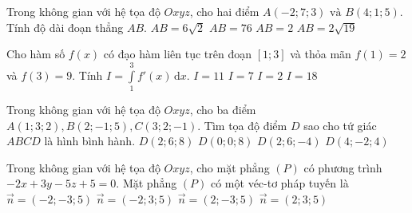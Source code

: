 \begin{ex}%
Trong không gian với hệ tọa độ $Oxyz$, cho hai điểm $A(-2;7;3) \text{ và } B(4;1;5)$. Tính độ dài đoạn thẳng $AB$.
\choice
{$AB=6\sqrt{2}$}
{$AB=76$}
{$AB=2$}
{\True $AB=2\sqrt{19}$}

\end{ex}


\begin{ex}%
Cho hàm số $f(x)$ có đạo hàm liên tục trên đoạn $[1;3]$ và thỏa mãn $f(1)=2$ và $f(3)=9$. Tính $I=\displaystyle\int\limits_1^3 f'(x)\mathrm{\,d}x$.
\choice
{$I=11$}
{\True $I=7$}
{$I=2$}
{$I=18$}

\end{ex}


\begin{ex}%
Trong không gian với hệ tọa độ $Oxyz$, cho ba điểm $A(1;3;2),B(2;-1;5),C(3;2;-1)$. Tìm tọa độ điểm $D$ sao cho tứ giác $ABCD$ là hình bình hành.
\choice
{$D(2;6;8)$}
{$D(0;0;8)$}
{\True $D(2;6;-4)$}
{$D(4;-2;4)$}

\end{ex}


\begin{ex}%
Trong không gian với hệ tọa độ $Oxyz$, cho mặt phẳng $(P)$ có phương trình $-2x+3y-5z+5=0$. Mặt phẳng $(P)$ có một véc-tơ pháp tuyến là
\choice
{$\overrightarrow{n}=(-2;-3;5)$}
{$\overrightarrow{n}=(-2;3;5)$}
{\True $\overrightarrow{n}=(2;-3;5)$}
{$\overrightarrow{n}=(2;3;5)$}

\end{ex}


